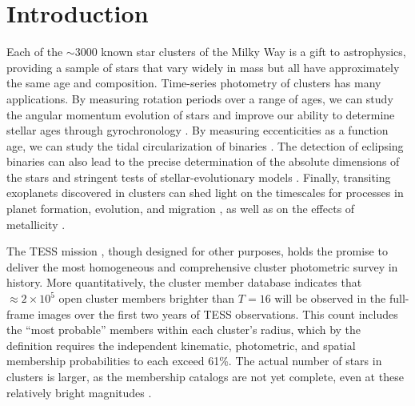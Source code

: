 \documentclass[12pt,twocolumn,tighten]{aastex62}
\begin{document}



\section{Introduction}
\label{sec:intro}

Each of the $\sim$3000 known star clusters of the Milky Way is a gift
to astrophysics, providing a sample of stars that vary widely in mass
but all have approximately the same age and composition.  Time-series
photometry of clusters has many applications. By measuring rotation
periods over a range of ages, we can study the angular momentum
evolution of stars and improve our ability to determine stellar ages
through gyrochronology \citep[{\it
e.g.},][]{skumanich_time_1972,barnes_color-period_2015,meibom_spin-down_2015,curtis_tess_2019}.
By measuring eccenticities as a function age, we can study the tidal
circularization of binaries
\citep{meibom_robust_2005,milliman_wiyn_2014,price-whelan_binary_2018}.
The detection of eclipsing binaries can also lead to the precise
determination of the absolute dimensions of the stars and stringent
tests of stellar-evolutionary models
\citep{luhman_formation_2012,stassun_review_2014,kraus_mass-radius_2015}.
Finally, transiting exoplanets discovered in clusters can shed light
on the timescales for processes in planet formation, evolution, and
migration
\citep[][]{Fortney_et_al_2007,Mann_K2_33b_2016,David_et_al_2017}, as
well as on the effects of metallicity
\citep[][]{fischer_planet-metallicity_2005,petigura_metallicity_2018}.

The TESS mission \citep{ricker_transiting_2015}, though designed for
other purposes, holds the promise to deliver the most homogeneous and
comprehensive cluster photometric survey in history.  More
quantitatively, the \citet{Kharchenko_et_al_2013} cluster member
database indicates that $\approx 2\times10^5$ open cluster members
brighter than $T=16$ will be observed in the full-frame images over
the first two years of TESS observations.  This count includes the
``most probable'' members within each cluster's radius, which by the
\citet{kharchenko_global_2012} definition requires the independent
kinematic, photometric, and spatial membership probabilities to each
exceed 61\%.  The actual number of stars in clusters is larger, as the
membership catalogs are not yet complete, even at these
relatively bright magnitudes \citep[{\it
e.g.},][]{roser_nine_RSG_2016,cantat-gaudin_gaia_2018,cantat-gaudin_newOCs_2019}.
\end{document}
